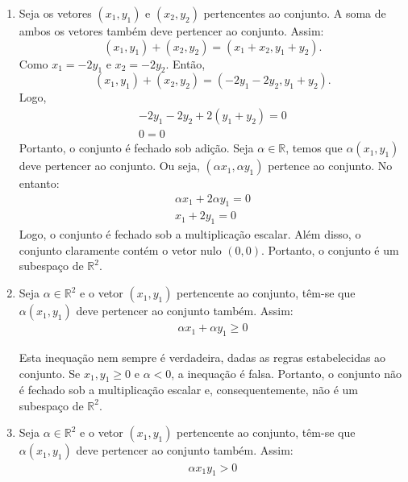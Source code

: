 \begin{resolution}
  \vspace{-24pt}
  \begin{enumerate}[label=\alph*)]
    \item Seja os vetores $(x_1, y_1)$ e $(x_2, y_2)$ pertencentes ao conjunto. A soma de ambos os vetores também deve pertencer ao conjunto. Assim:
          \begin{equation}
            (x_1, y_1) + (x_2, y_2) = (x_1 + x_2, y_1 + y_2).
          \end{equation}
          Como $x_1 = -2y_1$ e $x_2 = -2y_2$. Então,
          \begin{equation}
            (x_1, y_1) + (x_2, y_2) = (-2y_1-2y_2, y_1 + y_2).
          \end{equation}
          Logo,
          \begin{gather}
            -2y_1-2y_2 + 2 (y_1 + y_2) = 0 \\
            0 = 0
          \end{gather}
          Portanto, o conjunto é fechado sob adição. Seja $\alpha \in \mathbb{R}$, temos que $\alpha (x_1, y_1)$ deve pertencer ao conjunto. Ou seja, $(\alpha x_1, \alpha y_1)$ pertence ao conjunto. No entanto:
          \begin{gather}
            \alpha x_1  + 2 \alpha y_1 = 0 \\
            x_1  + 2 y_1 = 0
          \end{gather}
          Logo, o conjunto é fechado sob a multiplicação escalar. Além disso, o conjunto claramente contém o vetor nulo $(0,0)$. Portanto, o conjunto é um subespaço de $\mathbb{R}^2$.

    \item Seja $\alpha \in \mathbb{R}^2$ e o vetor $(x_1, y_1)$ pertencente ao conjunto, têm-se que $\alpha (x_1, y_1)$ deve pertencer ao conjunto também. Assim:
          \begin{gather}
            \alpha x_1 + \alpha y_1 \geq 0
          \end{gather}

          Esta inequação nem sempre é verdadeira, dadas as regras estabelecidas ao conjunto. Se $x_1, y_1 \geq 0$ e $\alpha < 0$, a inequação é falsa. Portanto, o conjunto não é fechado sob a multiplicação escalar e, consequentemente, não é um subespaço de $\mathbb{R}^2$.

    \item  Seja $\alpha \in \mathbb{R}^2$ e o vetor $(x_1, y_1)$ pertencente ao conjunto, têm-se que $\alpha (x_1, y_1)$ deve pertencer ao conjunto também. Assim:
          \begin{gather}
            \alpha x_1 y_1 > 0
          \end{gather}


\end{enumerate}
\end{resolution}
